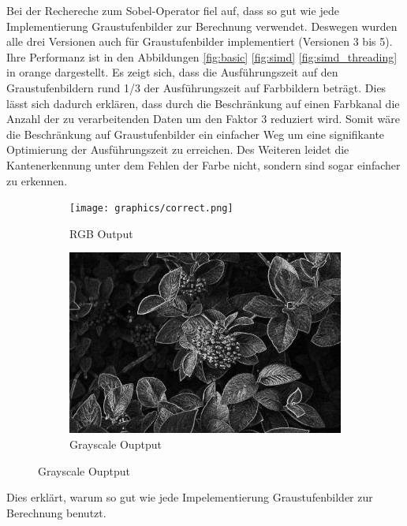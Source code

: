 \documentclass[course=erap]{aspdoc}
\begin{document}
Bei der Rechereche zum Sobel-Operator fiel auf, dass so gut wie jede Implementierung Graustufenbilder zur Berechnung verwendet.
Deswegen wurden alle drei Versionen auch für Graustufenbilder implementiert (Versionen 3 bis 5).
Ihre Performanz ist in den Abbildungen \ref{fig:basic} \ref{fig:simd} \ref{fig:simd_threading} in orange dargestellt.
Es zeigt sich, dass die Ausführungszeit auf den Graustufenbildern rund 1/3 der Ausführungszeit auf Farbbildern beträgt.
Dies lässt sich dadurch erklären, dass durch die Beschränkung auf einen Farbkanal die Anzahl der zu verarbeitenden Daten um den Faktor 3 reduziert wird.
Somit wäre die Beschränkung auf Graustufenbilder ein einfacher Weg um eine signifikante Optimierung der Ausführungszeit zu erreichen.
Des Weiteren leidet die Kantenerkennung unter dem Fehlen der Farbe nicht, sondern sind sogar einfacher zu erkennen.
\begin{figure}[H]
    \label{fig:simd_threading_results}
    \begin{subfigure}{.5\columnwidth}
        \centering
        \texttt{[image: graphics/correct.png]}
        \caption{RGB Output}
        \label{fig:correct_rgb}
    \end{subfigure}
    \begin{subfigure}{.5\columnwidth}
        \centering
        \includegraphics[width=\columnwidth]{graphics/correct_gray.png}
        \caption{Grayscale Ouptput}
        \label{fig:correct_graysc}
    \end{subfigure}
\end{figure}
Dies erklärt, warum so gut wie jede Impelementierung Graustufenbilder zur Berechnung benutzt.
\end{document}
